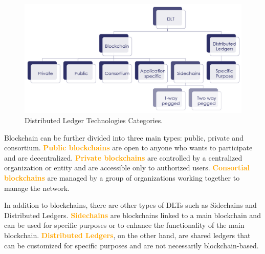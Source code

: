 \begin{figure}[h]
\centering\includegraphics[scale=0.3]{images/chapter3 - DLT.png}
\caption{Distributed Ledger Technologies Categories.}
\end{figure}

Blockchain can be further divided into three main types: public, private and consortium. \textbf{\textcolor{Orange}{Public blockchains}} are open to anyone who wants to participate and are decentralized. \textbf{\textcolor{Orange}{Private blockchains}} are controlled by a centralized organization or entity and are accessible only to authorized users. \textbf{\textcolor{Orange}{Consortial blockchains}} are managed by a group of organizations working together to manage the network.

In addition to blockchains, there are other types of DLTs such as Sidechains and Distributed Ledgers. \textbf{\textcolor{Orange}{Sidechains}} are blockchains linked to a main blockchain and can be used for specific purposes or to enhance the functionality of the main blockchain. \textbf{\textcolor{Orange}{Distributed Ledgers}}, on the other hand, are shared ledgers that can be customized for specific purposes and are not necessarily blockchain-based.
